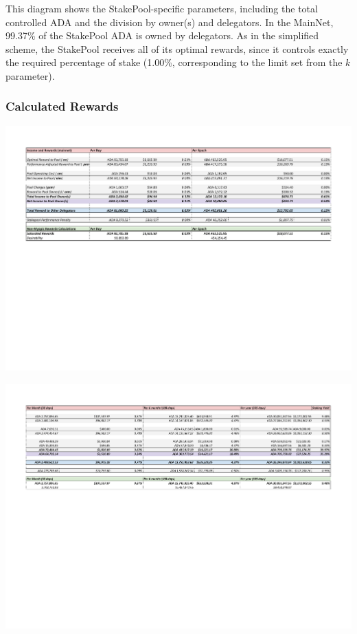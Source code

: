 \documentclass[11pt,a4paper,dvipsnames,twosided,final]{article}
\newcommand{\ada}{ADA{}}
\begin{document}
\noindent
This diagram shows the StakePool-specific parameters, including the total controlled \ada{} and the
division by owner(s) and delegators.  In the MainNet, 99.37\% of the StakePool \ada{} is owned
by delegators.  As in the simplified scheme, the StakePool receives all of its optimal rewards, since it controls
exactly the required percentage of stake (1.00\%, corresponding to the limit set from
the $k$ parameter).

\subsubsection*{Calculated Rewards}

\hspace{-0.65in}\begin{minipage}{\textwidth}
  \noindent  \includegraphics[width=1.2\textwidth]{RCM4.pdf}

  \vspace{-3in}
  \noindent  \includegraphics[width=1.2\textwidth]{RCM5.pdf}

  \vspace{-2.8in}
\end{minipage}
\end{document}
